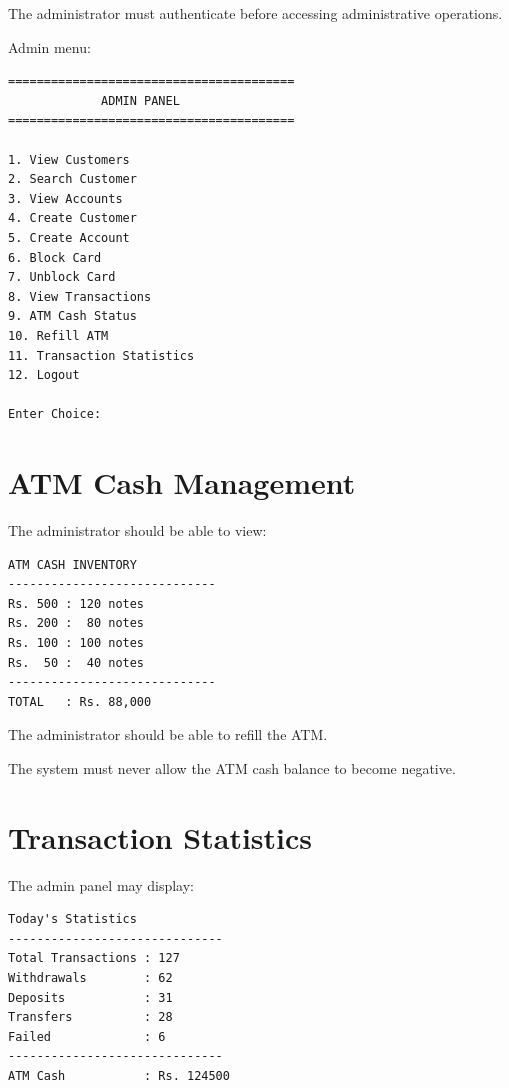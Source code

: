 \documentclass[12pt,a4paper]{article}
\begin{document}
The administrator must authenticate before accessing administrative
operations.

Admin menu:

\begin{verbatim}
========================================
             ADMIN PANEL
========================================

1. View Customers
2. Search Customer
3. View Accounts
4. Create Customer
5. Create Account
6. Block Card
7. Unblock Card
8. View Transactions
9. ATM Cash Status
10. Refill ATM
11. Transaction Statistics
12. Logout

Enter Choice:
\end{verbatim}


\section{ATM Cash Management}

The administrator should be able to view:

\begin{verbatim}
ATM CASH INVENTORY
-----------------------------
Rs. 500 : 120 notes
Rs. 200 :  80 notes
Rs. 100 : 100 notes
Rs.  50 :  40 notes
-----------------------------
TOTAL   : Rs. 88,000
\end{verbatim}

The administrator should be able to refill the ATM.

The system must never allow the ATM cash balance to become negative.


\section{Transaction Statistics}

The admin panel may display:

\begin{verbatim}
Today's Statistics
------------------------------
Total Transactions : 127
Withdrawals        : 62
Deposits           : 31
Transfers          : 28
Failed             : 6
------------------------------
ATM Cash           : Rs. 124500
\end{verbatim}


\end{document}
